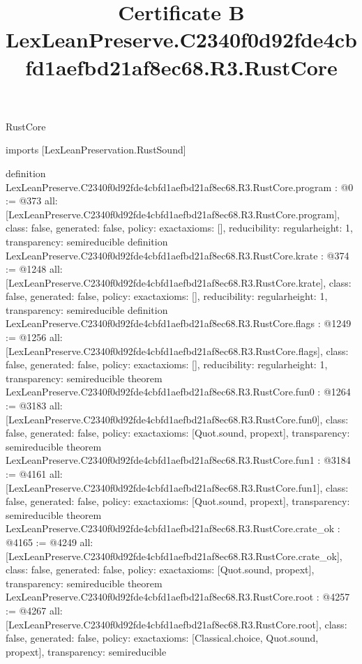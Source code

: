 \begin{lexlean}{RustCore}
\title{Certificate B LexLeanPreserve.C2340f0d92fde4cbfd1aefbd21af8ec68.R3.RustCore}
\begin{coremodule}
imports [LexLeanPreservation.RustSound]

definition LexLeanPreserve.C2340f0d92fde4cbfd1aefbd21af8ec68.R3.RustCore.program : @0 := @373 {
  all: [LexLeanPreserve.C2340f0d92fde4cbfd1aefbd21af8ec68.R3.RustCore.program],
  class: false,
  generated: false,
  policy: exact{axioms: []},
  reducibility: regular{height: 1},
  transparency: semireducible
}
definition LexLeanPreserve.C2340f0d92fde4cbfd1aefbd21af8ec68.R3.RustCore.krate : @374 := @1248 {
  all: [LexLeanPreserve.C2340f0d92fde4cbfd1aefbd21af8ec68.R3.RustCore.krate],
  class: false,
  generated: false,
  policy: exact{axioms: []},
  reducibility: regular{height: 1},
  transparency: semireducible
}
definition LexLeanPreserve.C2340f0d92fde4cbfd1aefbd21af8ec68.R3.RustCore.flags : @1249 := @1256 {
  all: [LexLeanPreserve.C2340f0d92fde4cbfd1aefbd21af8ec68.R3.RustCore.flags],
  class: false,
  generated: false,
  policy: exact{axioms: []},
  reducibility: regular{height: 1},
  transparency: semireducible
}
theorem LexLeanPreserve.C2340f0d92fde4cbfd1aefbd21af8ec68.R3.RustCore.fun0 : @1264 := @3183 {
  all: [LexLeanPreserve.C2340f0d92fde4cbfd1aefbd21af8ec68.R3.RustCore.fun0],
  class: false,
  generated: false,
  policy: exact{axioms: [Quot.sound, propext]},
  transparency: semireducible
}
theorem LexLeanPreserve.C2340f0d92fde4cbfd1aefbd21af8ec68.R3.RustCore.fun1 : @3184 := @4161 {
  all: [LexLeanPreserve.C2340f0d92fde4cbfd1aefbd21af8ec68.R3.RustCore.fun1],
  class: false,
  generated: false,
  policy: exact{axioms: [Quot.sound, propext]},
  transparency: semireducible
}
theorem LexLeanPreserve.C2340f0d92fde4cbfd1aefbd21af8ec68.R3.RustCore.crate_ok : @4165 := @4249 {
  all: [LexLeanPreserve.C2340f0d92fde4cbfd1aefbd21af8ec68.R3.RustCore.crate_ok],
  class: false,
  generated: false,
  policy: exact{axioms: [Quot.sound, propext]},
  transparency: semireducible
}
theorem LexLeanPreserve.C2340f0d92fde4cbfd1aefbd21af8ec68.R3.RustCore.root : @4257 := @4267 {
  all: [LexLeanPreserve.C2340f0d92fde4cbfd1aefbd21af8ec68.R3.RustCore.root],
  class: false,
  generated: false,
  policy: exact{axioms: [Classical.choice, Quot.sound, propext]},
  transparency: semireducible
}


\end{coremodule}
\end{lexlean}
